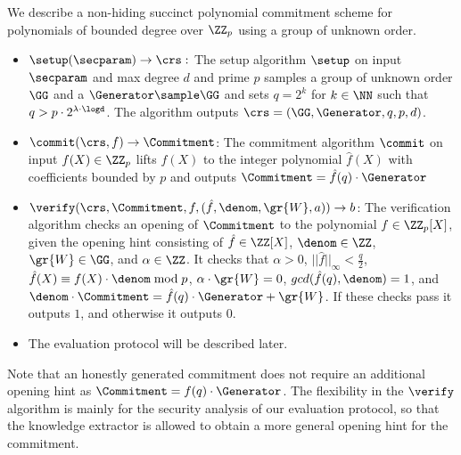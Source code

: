\begin{definition}
We describe a non-hiding succinct polynomial commitment scheme for polynomials of bounded degree over $\ZZ_p$ using a group of unknown order.
\begin{itemize}
	\item $\setup(\secparam) \rightarrow \crs:$
The setup algorithm $\setup$ on input $\secparam$ and max degree $d$ and prime $p$ samples a group of unknown order $\GG$ and a $\Generator \sample \GG$ and sets $q=2^k$ for $k \in \NN$ such that $q>p\cdot 2^{\lambda \cdot \logd}$. The algorithm outputs $\crs=(\GG,\Generator,q,p,d)$.

\item $\commit(\crs, f) \rightarrow \Commitment$: The commitment algorithm $\commit$ on input $f(X)\in \ZZ_p$ lifts $f(X)$ to the integer polynomial $\hat{f}(X)$ with coefficients bounded by $p$ and outputs $\Commitment =\hat{f}(q) \cdot \Generator$
\item $\verify(\crs, \Commitment, f, (\hat{f}, \denom,  \gr{W}, a)) \rightarrow b$: 
The verification algorithm checks an opening of $\Commitment$ to the polynomial $f \in \ZZ_p[X]$, given the opening hint consisting of $\hat{f}\in \ZZ[X]$, $\denom \in \ZZ$, $\gr{W} \in \GG$, and $\alpha \in \ZZ$. It checks that $\alpha > 0$, $||\hat{f}||_\infty < \frac{q}{2}$, $\hat{f}(X) \equiv f(X)\cdot \denom \bmod p$, $\alpha\cdot \gr{W}=0$, $gcd(\hat{f}(q), \denom) = 1$, and $\denom \cdot \Commitment =\hat{f}(q)\cdot \Generator +\gr{W}$. If these checks pass it outputs $1$, and otherwise it outputs $0$. 
\item The evaluation protocol will be described later.
\end{itemize}
Note that an honestly generated commitment does not require an additional opening hint as $\Commitment = f(q) \cdot \Generator$. The flexibility in the $\verify$ algorithm is mainly for the security analysis of our evaluation protocol, so that the knowledge extractor is allowed to obtain a more general opening hint for the commitment. 
\end{definition}


